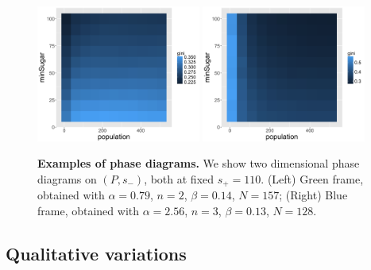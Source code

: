 \documentclass[Royal,sageh,times]{sagej}
\begin{document}
\begin{figure}
\centering
\includegraphics[width=0.48\textwidth]{figures/phasediagram_id27_maxSugar110}
\includegraphics[width=0.48\textwidth]{figures/phasediagram_id0_maxSugar110}
\caption{\textbf{Examples of phase diagrams.} We show two dimensional phase diagrams on $(P,s_-)$, both at fixed $s_+ = 110$. (Left) Green frame, obtained with $\alpha = 0.79$, $n=2$, $\beta = 0.14$, $N=157$; (Right) Blue frame, obtained with $\alpha = 2.56$, $n=3$, $\beta = 0.13$, $N=128$.}
\label{fig:sugarscape-phasediagrams}
\end{figure}


\subsection{Qualitative variations}
\end{document}
